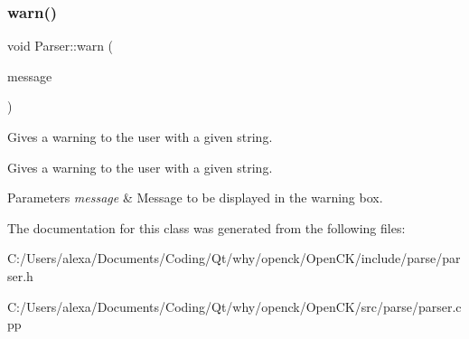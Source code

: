 \subsubsection{\texorpdfstring{warn()}{warn()}}
{\footnotesize\ttfamily void Parser\+::warn (\begin{DoxyParamCaption}\item[{Q\+String}]{message }\end{DoxyParamCaption})\hspace{0.3cm}{\ttfamily [static]}}



Gives a warning to the user with a given string. 

Gives a warning to the user with a given string. 
\begin{DoxyParams}{Parameters}
{\em message} & Message to be displayed in the warning box. \\
\hline
\end{DoxyParams}


The documentation for this class was generated from the following files\+:\begin{DoxyCompactItemize}
\item 
C\+:/\+Users/alexa/\+Documents/\+Coding/\+Qt/why/openck/\+Open\+C\+K/include/parse/parser.\+h\item 
C\+:/\+Users/alexa/\+Documents/\+Coding/\+Qt/why/openck/\+Open\+C\+K/src/parse/parser.\+cpp\end{DoxyCompactItemize}
